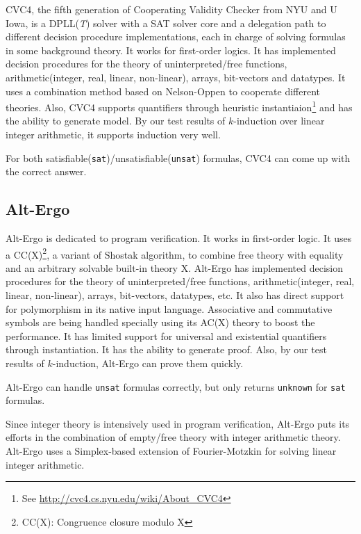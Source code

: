 \documentclass[10pt,letter]{article}
\theoremstyle{definition}
\begin{document}
CVC4, the fifth generation of Cooperating Validity Checker from NYU and U Iowa, is a DPLL({\it T}) solver with a SAT solver core and a delegation path to different decision procedure implementations, each in charge of solving formulas in some background theory\cite{barrett:cvc4:2011}. It works for first-order logics. It has implemented decision procedures for the theory of uninterpreted/free functions, arithmetic(integer, real, linear, non-linear), arrays, bit-vectors and datatypes. It uses a combination method based on Nelson-Oppen to cooperate different theories. Also, CVC4 supports quantifiers through heuristic instantiaion\footnote{See \url{http://cvc4.cs.nyu.edu/wiki/About_CVC4}} and has the ability to generate model. By our test results of $k$-induction over linear integer arithmetic, it supports induction very well.

For both satisfiable({\tt sat})/unsatisfiable({\tt unsat}) formulas, CVC4 can come up with the correct answer.

\subsection{Alt-Ergo}

Alt-Ergo is dedicated to program verification. It works in first-order logic. It uses a CC(X)\footnote{CC(X): Congruence closure modulo X}, a variant of Shostak algorithm, to combine free theory with equality and an arbitrary solvable built-in theory X\cite{conchonHDR2012}. Alt-Ergo has implemented decision procedures for the theory of uninterpreted/free functions, arithmetic(integer, real, linear, non-linear), arrays, bit-vectors, datatypes, etc. It also has direct support for polymorphism in its native input language. Associative and commutative symbols are being handled specially using its AC(X) theory to boost the performance. It has limited support for universal and existential quantifiers through instantiation. It has the ability to generate proof. Also, by our test results of $k$-induction, Alt-Ergo can prove them quickly.

Alt-Ergo can handle {\tt unsat} formulas correctly, but only returns {\tt unknown} for {\tt sat} formulas.

Since integer theory is intensively used in program verification, Alt-Ergo puts its efforts in the combination of empty/free theory with integer arithmetic theory. Alt-Ergo uses a Simplex-based extension of Fourier-Motzkin for solving linear integer arithmetic\cite{bobot:hal-00687640}.
\end{document}
